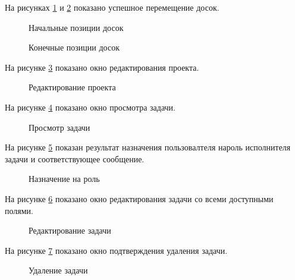 На рисунках \ref{перетаскивание_доски_1:image} и \ref{перетаскивание_доски_2:image} показано успешное перемещение досок.

\newpage

\begin{figure}[ht]
	\caption{Начальные позиции досок}
	\label{перетаскивание_доски_1:image}
\end{figure}

\begin{figure}[ht]
	\caption{Конечные позиции досок}
	\label{перетаскивание_доски_2:image}
\end{figure}

На рисунке \ref{проект_изменение:image} показано окно редактирования проекта.
\begin{figure}[ht]
	\caption{Редактирование проекта}
	\label{проект_изменение:image}
\end{figure}

На рисунке \ref{задача_просмотр:image} показано окно просмотра задачи.

\newpage

\begin{figure}[ht]
	\caption{Просмотр задачи}
	\label{задача_просмотр:image}
\end{figure}

На рисунке \ref{назначение_на_роль:image} показан результат назначения пользовалтеля нароль исполнителя задачи и соответствующее сообщение.
\begin{figure}[ht]
	\caption{Назначение на роль}
	\label{назначение_на_роль:image}
\end{figure}

На рисунке \ref{задача_изменение:image} показано окно редактирования задачи со всеми доступными полями.

\newpage

\begin{figure}[ht]
	\caption{Редактирование задачи}
	\label{задача_изменение:image}
\end{figure}

На рисунке \ref{задача_удаление:image} показано окно подтверждения удаления задачи.
\begin{figure}[ht]
	\caption{Удаление задачи}
	\label{задача_удаление:image}
\end{figure}

